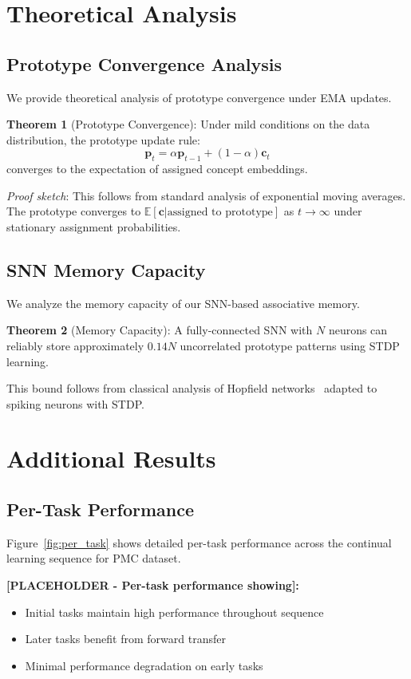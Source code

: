 \documentclass{article}
\begin{document}
\section{Theoretical Analysis}
\label{sec:appendix_theory}

\subsection{Prototype Convergence Analysis}

We provide theoretical analysis of prototype convergence under EMA updates.

\textbf{Theorem 1} (Prototype Convergence): Under mild conditions on the data distribution, the prototype update rule:
$$\mathbf{p}_t = \alpha \mathbf{p}_{t-1} + (1-\alpha) \mathbf{c}_t$$
converges to the expectation of assigned concept embeddings.

\emph{Proof sketch}: This follows from standard analysis of exponential moving averages. The prototype converges to $\mathbb{E}[\mathbf{c} | \text{assigned to prototype}]$ as $t \to \infty$ under stationary assignment probabilities.

\subsection{SNN Memory Capacity}

We analyze the memory capacity of our SNN-based associative memory.

\textbf{Theorem 2} (Memory Capacity): A fully-connected SNN with $N$ neurons can reliably store approximately $0.14N$ uncorrelated prototype patterns using STDP learning.

This bound follows from classical analysis of Hopfield networks~\cite{hopfield1982neural} adapted to spiking neurons with STDP.

\section{Additional Results}
\label{sec:appendix_results}

\subsection{Per-Task Performance}

Figure~\ref{fig:per_task} shows detailed per-task performance across the continual learning sequence for PMC dataset.

\textbf{[PLACEHOLDER - Per-task performance showing]:}
\begin{itemize}
\item Initial tasks maintain high performance throughout sequence
\item Later tasks benefit from forward transfer  
\item Minimal performance degradation on early tasks
\end{itemize}
\end{document}
